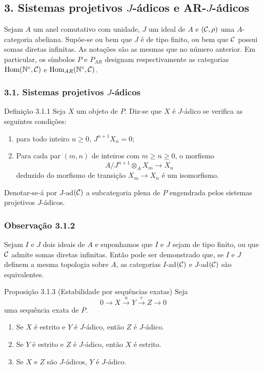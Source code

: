 \subsection*{3. Sistemas projetivos $J$-ádicos e AR-$J$-ádicos}
Sejam $A$ um anel comutativo com unidade, $J$ um ideal de $A$ e $(\mathcal C,\rho)$ uma $A$-categoria abeliana. Supõe-se ou bem que $J$ é de tipo finito, ou bem que $\mathcal C$ possui somas diretas infinitas. As notações são as mesmas que no número anterior. Em particular, os símbolos $P$ e $P_{AR}$ designam respectivamente as categorias $\operatorname{Hom}(\mathbb N^\circ,\mathcal C)$ e $\operatorname{Hom}_{AR}(\mathbb N^\circ,\mathcal C)$.

\subsubsection*{3.1. Sistemas projetivos $J$-ádicos}
\begin{statement}{Definição 3.1.1}
Seja $X$ um objeto de $P$. Diz-se que $X$ é $J$-ádico se verifica as seguintes condições:
\begin{enumerate}[label=(\roman*)]
\item para todo inteiro $n\ge0$, $J^{n+1}X_n=0$;
\item Para cada par $(m,n)$ de inteiros com $m\ge n\ge0$, o morfismo
\[
A/J^{n+1}\otimes_A X_m\longrightarrow X_n
\]
deduzido do morfismo de transição $X_m\to X_n$ é um isomorfismo.
\end{enumerate}
\end{statement}
Denotar-se-á por $J$-ad$(\mathcal C)$ a subcategoria plena de $P$ engendrada pelos sistemas projetivos $J$-ádicos.

\subsubsection*{Observação 3.1.2}
Sejam $I$ e $J$ dois ideais de $A$ e suponhamos que $I$ e $J$ sejam de tipo finito, ou que $\mathcal C$ admite somas diretas infinitas. Então pode ser demonstrado que, se $I$ e $J$ definem a mesma topologia sobre $A$, as categorias $I$-ad$(\mathcal C)$ e $J$-ad$(\mathcal C)$ são equivalentes.

\begin{statement}{Proposição 3.1.3 (Estabilidade por sequências exatas)}
Seja
\[
0\longrightarrow X\stackrel{u}{\longrightarrow}Y\stackrel{v}{\longrightarrow}Z\longrightarrow0
\]
uma sequência exata de $P$.
\begin{enumerate}[label=(\roman*)]
\item Se $X$ é estrito e $Y$ é $J$-ádico, então $Z$ é $J$-ádico.
\item Se $Y$ é estrito e $Z$ é $J$-ádico, então $X$ é estrito.
\item Se $X$ e $Z$ são $J$-ádicos, $Y$ é $J$-ádico.
\end{enumerate}
\end{statement}

